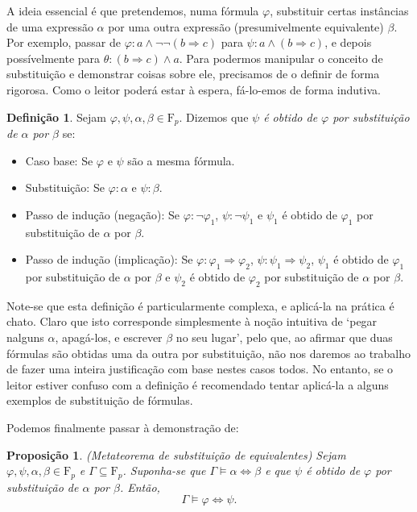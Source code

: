 \documentclass{report}
\newtheorem{prop}{Proposição}
\theoremstyle{definition}
\newtheorem{definicao}{Definição}
\theoremstyle{remark}
\newcommand{\F}{\mathrm{F}}
\newcommand{\imply}{\mathbin{\Rightarrow}}
\newcommand{\eqv}{\mathbin{\Leftrightarrow}}
\begin{document}
	A ideia essencial é que pretendemos, numa fórmula $\varphi$, substituir certas instâncias de uma expressão $\alpha$ por uma outra expressão (presumivelmente equivalente) $\beta$. Por exemplo, passar de $\varphi : a \land \neg \neg (b \imply c)$ para $\psi : a \land (b \imply c)$, e depois possívelmente para $\theta : (b \imply c) \land a$. Para podermos manipular o conceito de substituição e demonstrar coisas sobre ele, precisamos de o definir de forma rigorosa. Como o leitor poderá estar à espera, fá-lo-emos de forma indutiva.
	
	\begin{definicao}
	Sejam $\varphi, \psi, \alpha, \beta \in \F_p$. Dizemos que \emph{$\psi$ é obtido de $\varphi$ por substituição de $\alpha$ por $\beta$} se:
	
	\begin{itemize}
	\item Caso base: Se $\varphi$ e $\psi$ são a mesma fórmula.
	
	\item Substituição: Se $\varphi : \alpha$ e $\psi : \beta$.
	
	\item Passo de indução (negação): Se $\varphi : \neg \varphi_1$, $\psi : \neg \psi_1$ e $\psi_1$ é obtido de $\varphi_1$ por substituição de $\alpha$ por $\beta$.
	
	\item Passo de indução (implicação): Se $\varphi : \varphi_1 \imply \varphi_2$, $\psi : \psi_1 \imply \psi_2$, $\psi_1$ é obtido de $\varphi_1$ por substituição de $\alpha$ por $\beta$ e $\psi_2$ é obtido de $\varphi_2$ por substituição de $\alpha$ por $\beta$.
	\end{itemize}
	\end{definicao}
	
	Note-se que esta definição é particularmente complexa, e aplicá-la na prática é chato. Claro que isto corresponde simplesmente à noção intuitiva de `pegar nalguns $\alpha$, apagá-los, e escrever $\beta$ no seu lugar', pelo que, ao afirmar que duas fórmulas são obtidas uma da outra por substituição, não nos daremos ao trabalho de fazer uma inteira justificação com base nestes casos todos. No entanto, se o leitor estiver confuso com a definição é recomendado tentar aplicá-la a alguns exemplos de substituição de fórmulas.
	
	Podemos finalmente passar à demonstração de:
	
	\begin{prop}
	(Metateorema de substituição de equivalentes) Sejam $\varphi, \psi, \alpha, \beta \in \F_p$ e $\Gamma \subseteq \F_p$. Suponha-se que $\Gamma \vDash \alpha \eqv \beta$ e que $\psi$ é obtido de $\varphi$ por substituição de $\alpha$ por $\beta$. Então,
	\[\Gamma \vDash \varphi \eqv \psi.\]
	\end{prop}
	
\end{document}
